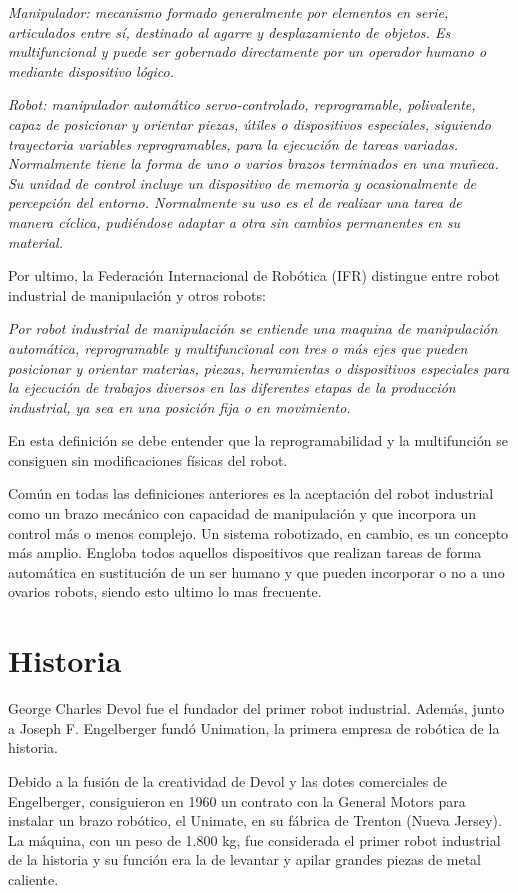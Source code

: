 \documentclass[12pt,a4paper]{report}
\begin{document}
\emph{Manipulador: mecanismo formado generalmente por elementos en serie, articulados
entre sí, destinado al agarre y desplazamiento de objetos. Es multifuncional y
puede ser gobernado directamente por un operador humano o mediante dispositivo
lógico.}

\emph{Robot: manipulador automático servo-controlado, reprogramable, polivalente,
capaz de posicionar y orientar piezas, útiles o dispositivos especiales,
siguiendo trayectoria variables reprogramables, para la ejecución de tareas
variadas. Normalmente tiene la forma de uno o varios brazos terminados en una
muñeca. Su unidad de control incluye un dispositivo de memoria y ocasionalmente
de percepción del entorno. Normalmente su uso es el de realizar una tarea de
manera cíclica, pudiéndose adaptar a otra sin cambios permanentes en su
material.}

Por ultimo, la Federación Internacional de Robótica (IFR) distingue entre robot
industrial de manipulación y otros robots:

\emph{Por robot industrial de manipulación se entiende una maquina de manipulación
automática, reprogramable y multifuncional con tres o más ejes que pueden
posicionar y orientar materias, piezas, herramientas o dispositivos especiales
para la ejecución de trabajos diversos en las diferentes etapas de la producción
industrial, ya sea en una posición fija o en movimiento.}

En esta definición se debe entender que la reprogramabilidad y la multifunción
se consiguen sin modificaciones físicas del robot.

Común en todas las definiciones anteriores es la aceptación del robot industrial
como un brazo mecánico con capacidad de manipulación y que incorpora un control
más o menos complejo. Un sistema robotizado, en cambio, es un concepto más
amplio. Engloba todos aquellos dispositivos que realizan tareas de forma
automática en sustitución de un ser humano y que pueden incorporar o no a uno
ovarios robots, siendo esto ultimo lo mas frecuente.

\section{Historia}

George Charles Devol fue el fundador del primer robot industrial.
Además, junto a Joseph F. Engelberger fundó Unimation, la primera empresa de
robótica de la historia.

Debido a la fusión de la creatividad de Devol y las dotes comerciales de
Engelberger, consiguieron en 1960 un contrato con la General Motors para
instalar un brazo robótico, el Unimate, en su fábrica de Trenton (Nueva Jersey).
La máquina, con un peso de 1.800 kg, fue considerada el primer robot industrial
de la historia y su función era la de levantar y apilar grandes piezas de metal
caliente.
\end{document}
